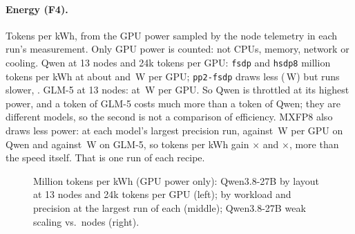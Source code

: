 \paragraph{Energy (F4).} Tokens per kWh, from the GPU power sampled by the node telemetry in each run's measurement. Only GPU power is counted: not CPUs, memory, network or cooling. Qwen at 13 nodes and 24k tokens per GPU: \texttt{fsdp} \TriEnergyFsdp{} and \texttt{hsdp8} \TriEnergyHsdp{} million tokens per kWh at about \TriPowerFsdp{} and \TriPowerHsdp\,W per GPU; \texttt{pp2-fsdp} draws less (\TriPowerPp\,W) but runs slower, \TriEnergyPp. GLM-5 at 13 nodes: \TriEnergyGlm{} at \TriPowerGlm\,W per GPU. So Qwen is throttled at its highest power, and a token of GLM-5 costs much more than a token of Qwen; they are different models, so the second is not a comparison of efficiency. MXFP8 also draws less power: at each model's largest precision run, \TriPowerFpQMx{} against \TriPowerFpQBf\,W per GPU on Qwen and \TriPowerFpGMx{} against \TriPowerFpGBf\,W on GLM-5, so tokens per kWh gain $\times$\TriEnergyFpQ{} and $\times$\TriEnergyFpG, more than the speed itself. That is one run of each recipe.

\begin{figure}[h]
  \centering{}
  \caption{Million tokens per kWh (GPU power only): Qwen3.8-27B by layout at 13 nodes and 24k tokens per GPU (left); by workload and precision at the largest run of each (middle); Qwen3.8-27B weak scaling vs.\ nodes (right). }
  \label{fig:energy}
\end{figure}
